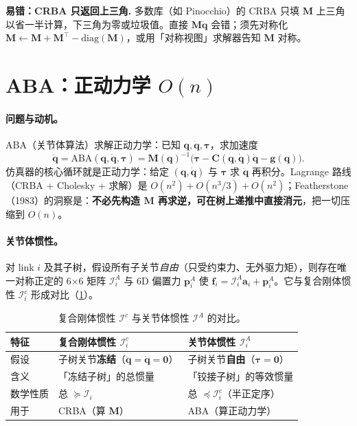 \begin{note}
\textbf{易错：CRBA 只返回上三角.}\;
多数库（如 Pinocchio）的 CRBA 只填 $\mathbf M$ 上三角以省一半计算，下三角为零或垃圾值。直接 $\mathbf M\ddot{\mathbf q}$ 会错；须先对称化 $\mathbf M\!\leftarrow\!\mathbf M+\mathbf M^\top-\mathrm{diag}(\mathbf M)$，或用「对称视图」求解器告知 $\mathbf M$ 对称。
\end{note}

\section{ABA：正动力学 \texorpdfstring{$O(n)$}{O(n)}}
\label{sec:on-aba}

\paragraph{问题与动机。}
ABA（关节体算法）求解正动力学：已知 $\mathbf q,\dot{\mathbf q},\boldsymbol\tau$，求加速度
\begin{equation}
  \ddot{\mathbf q}=\mathrm{ABA}(\mathbf q,\dot{\mathbf q},\boldsymbol\tau)=\mathbf M(\mathbf q)^{-1}\big(\boldsymbol\tau-\mathbf C(\mathbf q,\dot{\mathbf q})\dot{\mathbf q}-\mathbf g(\mathbf q)\big).
  \label{eq:on-aba-def}
\end{equation}
仿真器的核心循环就是正动力学：给定 $(\mathbf q,\dot{\mathbf q})$ 与 $\boldsymbol\tau$ 求 $\ddot{\mathbf q}$ 再积分。Lagrange 路线（CRBA + Cholesky + 求解）是 $O(n^2)+O(n^3/3)+O(n^2)$；Featherstone（1983）的洞察是：\textbf{不必先构造 $\mathbf M$ 再求逆，可在树上递推中直接消元}，把一切压缩到 $O(n)$\cite{featherstone1983calculation}。

\paragraph{关节体惯性。}
对 link $i$ 及其子树，假设所有子关节\emph{自由}（只受约束力、无外驱力矩），则存在唯一对称正定的 6×6 矩阵 $\mathcal I_i^A$ 与 6D 偏置力 $\mathbf p_i^A$ 使 $\mathbf f_i=\mathcal I_i^A\mathbf a_i+\mathbf p_i^A$。它与复合刚体惯性 $\mathcal I_i^c$ 形成对比（\cref{tab:on-IA-Ic}）。

\begin{table}[H]\centering\small
\caption{复合刚体惯性 $\mathcal I^c$ 与关节体惯性 $\mathcal I^A$ 的对比。}
\label{tab:on-IA-Ic}
\begin{tabular}{lll}
\toprule
特征 & 复合刚体惯性 $\mathcal I_i^c$ & 关节体惯性 $\mathcal I_i^A$ \\
\midrule
假设 & 子树关节\textbf{冻结}（$\ddot{\mathbf q}=\dot{\mathbf q}=\mathbf 0$） & 子树关节\textbf{自由}（$\boldsymbol\tau=\mathbf 0$） \\
含义 & 「冻结子树」的总惯量 & 「铰接子树」的等效惯量 \\
数学性质 & 总 $\succeq\mathcal I_i$ & 总 $\preceq\mathcal I_i^c$（半正定序） \\
用于 & CRBA（算 $\mathbf M$） & ABA（算正动力学） \\
\bottomrule
\end{tabular}
\end{table}

